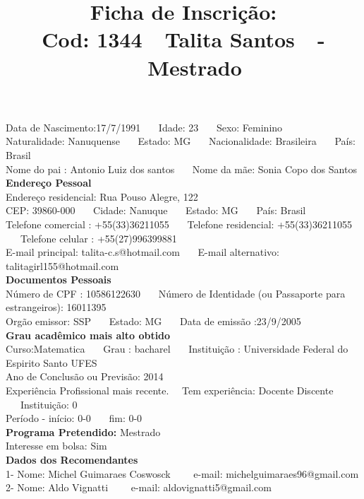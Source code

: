 \documentclass[11pt]{article}
\title{\vspace*{-4cm} Ficha de Inscrição: \\Cod: 1344\ \ Talita  Santos\ \ - \ \ Mestrado 
 }
\date{}
\begin{document}
\maketitle
\vspace*{-1.5cm}
\noindent Data de Nascimento:17/7/1991
\ \ \ Idade: 23   \ \ \ Sexo: Feminino
\\
Naturalidade: Nanuquense   
\ \ \  Estado: MG
\ \ \  Nacionalidade: Brasileira
\ \ \ País: Brasil
\\        
Nome do pai : Antonio Luiz dos santos
\ \ \ Nome da mãe: Sonia Copo dos Santos          
\\[0.2cm]                     
\textbf{Endereço Pessoal} 
\\ 
\noindent Endereço residencial: Rua Pouso Alegre, 122
\\
        CEP: 39860-000 
\ \ \ Cidade: Nanuque 
\ \ \ Estado: MG 
\ \ \ País: Brasil
\\		
		Telefone comercial : +55(33)36211055
\ \ \ Telefone residencial: +55(33)36211055
\ \ \ Telefone celular : +55(27)996399881
\\
E-mail principal: talita-c.s@hotmail.com
\ \ \ E-mail alternativo: talitagirl155@hotmail.com 
\\[0.2cm] 
\textbf{Documentos Pessoais}
\\
\noindent Número de CPF : 10586122630
\ \ \ Número de Identidade (ou Passaporte para estrangeiros): 16011395
\\
Orgão emissor: SSP
\ \ \ Estado: MG
\ \ \ Data de emissão :23/9/2005
\\[0.3cm]
\textbf{Grau acadêmico mais alto obtido}
\\	
Curso:Matematica
\ \ \ Grau : bacharel
\ \ \ Instituição : Universidade Federal do Espirito Santo UFES
\\			
Ano de Conclusão ou Previsão: 2014
\\ 
Experiência Profissional mais recente. \ \  
Tem experiência: Docente Discente  
\ \ \ Instituição: 0
\\  
Período - início: 0-0
\ \ \ fim: 0-0
\\[0.2cm] 
\textbf{Programa Pretendido:} Mestrado\\
Interesse em bolsa: Sim
\\[0.3cm]		
\textbf{Dados dos Recomendantes} 
\\
1- Nome: Michel Guimaraes Coswosck
\ \ \ \  e-mail: michelguimaraes96@gmail.com 
\\
2- Nome: Aldo Vignatti
\ \ \ \ e-mail: aldovignatti5@gmail.com
\\
\end{document}
